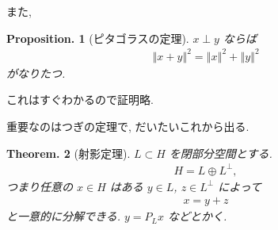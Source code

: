 \documentclass[openany, a4paper, oneside]{jsbook}
\theoremstyle{break}
\theoremstyle{breakdefn}
\newtheorem{thm}{Theorem.}[section]
\newtheorem{prop}[thm]{Proposition.}
\newcommand{\norm}[1]{\left\Vert#1\right\Vert}
\begin{document}
また,
\begin{prop}[ピタゴラスの定理]
$x \perp y$ ならば
\begin{align}
 \norm{x + y}^2
 =
 \norm{x}^2 + \norm{y}^2
\end{align}
がなりたつ.
\end{prop}
これはすぐわかるので証明略.

重要なのはつぎの定理で, だいたいこれから出る.
\begin{thm}[射影定理]
 $L \subset H$ を閉部分空間とする.
 \begin{align}
  H
  =
  L \oplus L^{\perp},
 \end{align}
 つまり任意の $x \in H$ はある $y \in L$, $z \in L^{\perp}$ によって
 \begin{align}
  x = y + z
 \end{align}
 と一意的に分解できる.
 $y = P_Lx$ などとかく.
\end{thm}
\end{document}
